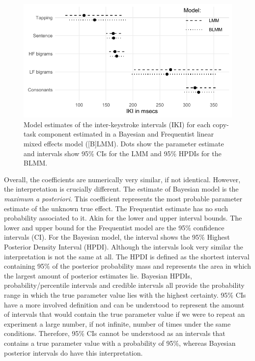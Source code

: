 \documentclass[,man,floatsintext]{apa6}
\begin{document}
\begin{appendix}
\begin{figure}[!h]

{\centering \includegraphics{ct_files/figure-latex/fig0-1} 

}

\caption{\label{fig:lmms}Model estimates of the inter-keystroke intervals (IKI) for each copy-task component estimated in a Bayesian and Frequentist linear mixed effects model ([B]LMM). Dots show the parameter estimate and intervals show 95\% CIs for the LMM and 95\% HPDIs for the BLMM.}\label{fig:fig0}
\end{figure}

Overall, the coefficients are numerically very similar, if not
identical. However, the interpretation is crucially different. The
estimate of Bayesian model is the \textit{maximum a posteriori}. This
coefficient represents the most probable parameter estimate of the
unknown true effect. The Frequentist estimate has no such probability
associated to it. Akin for the lower and upper interval bounds. The
lower and upper bound for the Frequentist model are the 95\% confidence
intervals (CI). For the Bayesian model, the interval shows the 95\%
Highest Posterior Density Interval (HPDI). Although the intervals look
very similar the interpretation is not the same at all. The HPDI is
defined as the shortest interval containing 95\% of the posterior
probability mass and represents the area in which the largest amount of
posterior estimates lie. Bayesian HPDIs, probability/percentile
intervals and credible intervals all provide the probability range in
which the true parameter value lies with the highest certainty. 95\% CIs
have a more involved definition and can be understood to represent the
amount of intervals that would contain the true parameter value if we
were to repeat an experiment a large number, if not infinite, number of
times under the same conditions. Therefore, 95\% CIs cannot be
understood as an intervals that contains a true parameter value with a
probability of 95\%, whereas Bayesian posterior intervals do have this
interpretation.


\end{appendix}
\end{document}
